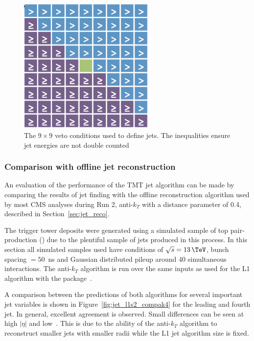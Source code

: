 \begin{figure}
\centering
    \includegraphics[width=0.6\textwidth]{./Figures/triggerUpgrade/mask.png}
  \caption{The $9\times9$ veto conditions used to define jets. The inequalities ensure
  jet energies are not double counted}
  \label{mask}
\end{figure}

\subsubsection{Comparison with offline jet reconstruction}

An evaluation of the performance of the TMT jet algorithm can be made by comparing
the results of jet finding with the offline reconstruction algorithm used by 
most CMS analyses during Run 2, anti-$k_T$ with a distance
parameter of 0.4, described in Section~\ref{sec:jet_reco}. 

The trigger tower deposits were generated using a simulated sample of 
top pair-production (\ttj) due to the plentiful sample of jets produced in this process. 
In this section all simulated samples used have conditions 
of $\sqrt{s} = 13\,\TeV$, bunch spacing $ = 50$~ns and Gaussian distributed pileup around $40$ simultaneous interactions. 
The anti-$k_T$ algorithm is run over the same inputs as
used for the L1 algorithm with the \FASTJET package~\cite{fastjet}.

A comparison between the predictions of both algorithms for several important jet variables is shown in 
Figure~\ref{fig:jet_l1s2_compak4} for the leading and fourth jet. In general, excellent agreement is observed. 
Small differences can be seen at high $|\eta|$ and low~\pt. This is due to the ability 
of the anti-$k_T$ algorithm to reconstruct smaller jets with smaller radii while the L1 jet
algorithm size is fixed.



